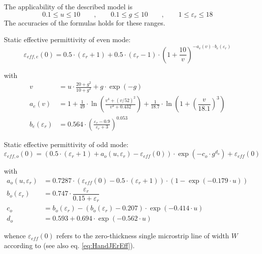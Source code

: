 The applicability of the described model is
\begin{equation}
0.1\le u\le 10 \qquad,\qquad 0.1\le g\le 10 \qquad,\qquad 1\le \varepsilon_r\le 18
\end{equation}
The accuracies of the formulas holds for these ranges.

\addvspace{12pt}

Static effective permittivity of even mode:
\begin{equation}
\varepsilon_{eff,e}(0) = 0.5\cdot (\varepsilon_r+1) + 0.5\cdot (\varepsilon_r-1)\cdot
      \left( 1+\dfrac{10}{v} \right) ^{-a_e\left(v\right)\cdot b_e\left(\varepsilon_r\right)}
\end{equation}

with
\begin{align}
v &= u\cdot\frac{20+g^2}{10+g^2} + g\cdot\exp{\left(-g\right)}\\
a_e\left(v\right) &= 1 + \frac{1}{49}\cdot\ln\left( \frac{v^4 + \left( v/52 \right)^2}{v^4 + 0.432} \right)
    + \frac{1}{18.7}\cdot\ln\left( 1 + \left( \dfrac{v}{18.1} \right)^3 \right)\\
b_e\left(\varepsilon_r\right) &= 0.564\cdot\left( \frac{\varepsilon_r-0.9}{\varepsilon_r+3} \right)^{0.053}
\end{align}

Static effective permittivity of odd mode:
\begin{equation}
\varepsilon_{eff,o}(0) = \left(0.5\cdot \left(\varepsilon_r+1\right) + a_o\left(u,\varepsilon_r\right) - \varepsilon_{eff}(0) \right) \cdot
      \exp{\left(-c_o\cdot g^{d_o}\right)} + \varepsilon_{eff}(0)
\end{equation}

with
\begin{align}
a_o\left(u,\varepsilon_r\right) &= 0.7287\cdot\left( \varepsilon_{eff}(0) - 0.5\cdot \left( \varepsilon_r + 1\right) \right) \cdot
      \left(1-\exp{\left(-0.179\cdot u\right)}\right)\\
b_o\left(\varepsilon_r\right) &= 0.747\cdot\dfrac{\varepsilon_r}{0.15+\varepsilon_r}\\
c_o &= b_o(\varepsilon_r) - \left(b_o\left(\varepsilon_r\right)-0.207\right)\cdot\exp{\left(-0.414\cdot u\right)}\\
d_o &= 0.593+0.694\cdot\exp{\left(-0.562\cdot u\right)}
\end{align}

whence $\varepsilon_{eff}(0)$ refers to the zero-thickness single
microstrip line of width $W$ according to \cite{Hammerstad} (see also
eq. \eqref{eq:HandJErEff}).

